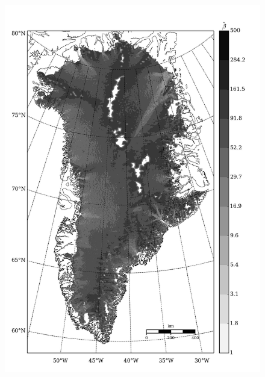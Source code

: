 \begin{figure}
  \centering
  \begin{minipage}[b]{0.47\linewidth}
    \includegraphics[width=1.0\textwidth]{images/greenland/stats/GLM_beta_no_Mb.jpg}
  \end{minipage}
  \quad
  \begin{minipage}[b]{0.47\linewidth}

\end{minipage}
\end{figure}
